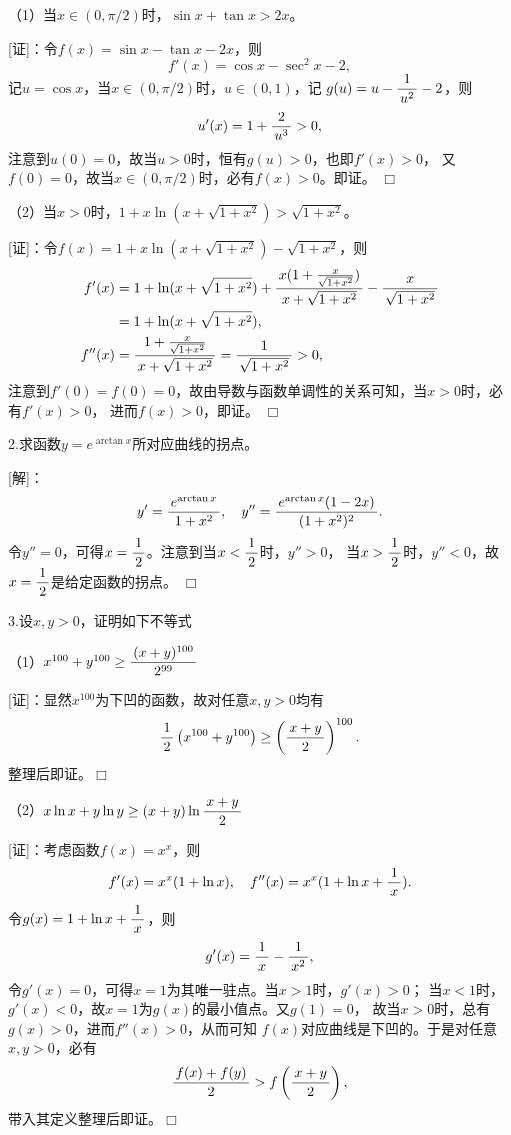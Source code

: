 （1）当$x\in(0,\pi/2)$时，$\sin x+\tan x>2x$。

[证]：令$f(x)=\sin x-\tan x-2x$，则
$$f'(x)=\cos x-\sec^2x-2,$$
记$u=\cos x$，当$x\in(0,\pi/2)$时，$u\in(0,1)$，记
$g(u)=u-\displaystyle\frac{\,{1}\,}{\,{u^2}\,}-2$，则
$$u'(x)=1+\displaystyle\frac{\,{2}\,}{\,{u^3}\,}>0,$$
注意到$u(0)=0$，故当$u>0$时，恒有$g(u)>0$，也即$f'(x)>0$，
又$f(0)=0$，故当$x\in(0,\pi/2)$时，必有$f(x)>0$。即证。
\hfill$\Box$

\bigskip

（2）当$x>0$时，$1+x\ln(x+\sqrt{1+x^2})>\sqrt{1+x^2}$。

[证]：令$f(x)=1+x\ln(x+\sqrt{1+x^2})-\sqrt{1+x^2}$，则
\begin{align*}
	f'(x)&=1+\ln(x+\sqrt{1+x^2})+\displaystyle\frac{\,{x(1+\frac{x}{\sqrt{1+x^2}})}\,}{\,{x+\sqrt{1+x^2}}\,}-\displaystyle\frac{\,{x}\,}{\,{\sqrt{1+x^2}}\,}\\
	&=1+\ln(x+\sqrt{1+x^2}),\\
	f''(x)&=\displaystyle\frac{\,{1+\frac{x}{\sqrt{1+x^2}}}\,}{\,{x+\sqrt{1+x^2}}\,}=\displaystyle\frac{\,{1}\,}{\,{\sqrt{1+x^2}}\,}>0,
\end{align*}
注意到$f'(0)=f(0)=0$，故由导数与函数单调性的关系可知，当$x>0$时，必有$f'(x)>0$，
进而$f(x)>0$，即证。
\hfill$\Box$

\bigskip

2.求函数$y=e^{\arctan x}$所对应曲线的拐点。

[解]：
$$y'=\displaystyle\frac{\,{e^{\arctan x}}\,}{\,{1+x^2}\,},\quad
y''=\displaystyle\frac{\,{e^{\arctan x}(1-2x)}\,}{\,{(1+x^2)^2}\,}.$$
令$y''=0$，可得$x=\displaystyle\frac{\,{1}\,}{\,{2}\,}$。注意到当$x<\displaystyle\frac{\,{1}\,}{\,{2}\,}$时，$y''>0$，
当$x>\displaystyle\frac{\,{1}\,}{\,{2}\,}$时，$y''<0$，故$x=\displaystyle\frac{\,{1}\,}{\,{2}\,}$是给定函数的拐点。
\hfill$\Box$

\bigskip

3.设$x,y>0$，证明如下不等式

（1）$x^{100}+y^{100}\geq\displaystyle\frac{\,{(x+y)^{100}}\,}{\,{2^{99}}\,}$

[证]：显然$x^{100}$为下凹的函数，故对任意$x,y>0$均有
$$\displaystyle\frac{\,{1}\,}{\,{2}\,}\left(x^{100}+y^{100}\right)\geq
\left(\displaystyle\frac{\,{x+y}\,}{\,{2}\,}\right)^{100}.$$
整理后即证。\hfill$\Box$

\bigskip

（2）$x\ln x+y\ln y\geq (x+y)\ln\displaystyle\frac{\,{x+y}\,}{\,{2}\,}$

[证]：考虑函数$f(x)=x^x$，则
$$f'(x)=x^x(1+\ln x),\quad
f''(x)=x^x(1+\ln x+\displaystyle\frac{\,{1}\,}{\,{x}\,}).$$
令$g(x)=1+\ln x+\displaystyle\frac{\,{1}\,}{\,{x}\,}$，则
$$g'(x)=\displaystyle\frac{\,{1}\,}{\,{x}\,}-\displaystyle\frac{\,{1}\,}{\,{x^2}\,},$$
令$g'(x)=0$，可得$x=1$为其唯一驻点。当$x>1$时，$g'(x)>0$；
当$x<1$时，$g'(x)<0$，故$x=1$为$g(x)$的最小值点。又$g(1)=0$，
故当$x>0$时，总有$g(x)>0$，进而$f''(x)>0$，从而可知
$f(x)$对应曲线是下凹的。于是对任意$x,y>0$，必有
$$\displaystyle\frac{\,{f(x)+f(y)}\,}{\,{2}\,}>f\left(\displaystyle\frac{\,{x+y}\,}{\,{2}\,}\right),$$
带入其定义整理后即证。\hfill$\Box$

\bigskip

